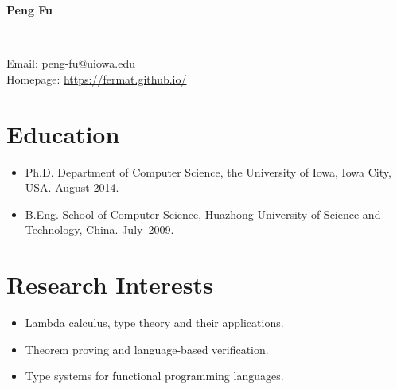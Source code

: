 \documentclass{article}
\begin{document}
\begin{center}
{\Large{\bfseries Peng Fu}}

\

Email: peng-fu@uiowa.edu\\
Homepage: \url{https://fermat.github.io/}

\end{center}



\section*{Education}

\begin{itemize}
\item Ph.D. Department of Computer Science, the University of Iowa, Iowa City, USA. August 2014. 
  \item B.Eng. School of Computer Science, Huazhong University of Science and Technology, China. July~2009. %
\end{itemize}


\section*{Research Interests}
\begin{itemize}
\item Lambda calculus, type theory and their applications.
\item Theorem proving and language-based verification. 
\item Type systems for functional programming languages. 
  
\end{itemize}
\end{document}

